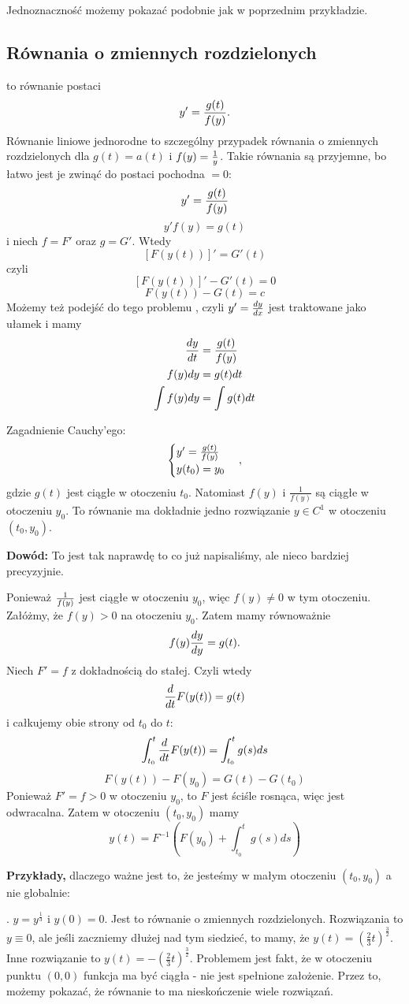 Jednoznaczność możemy pokazać podobnie jak w poprzednim przykładzie.

\subsection{Równania o zmiennych rozdzielonych}

 to równanie postaci
$$y'={g(t)\over f(y)}.$$
Równanie liniowe jednorodne to szczególny przypadek równania o zmiennych rozdzielonych dla $g(t)=a(t)$ i $f(y)={1\over y}$. Takie równania są przyjemne, bo łatwo jest je zwinąć do postaci pochodna $=0$:
$$y'={g(t)\over f(y)}$$
$$y'f(y)=g(t)$$
i niech $f=F'$ oraz $g=G'$. Wtedy
$$[F(y(t))]'=G'(t)$$
czyli
$$[F(y(t))]'-G'(t)=0$$
$$F(y(t))-G(t)=c$$
Możemy też podejść do tego problemu , czyli $y'={dy\over dx}$ jest traktowane jako ułamek i mamy
\begin{align*}
    {dy\over dt}&={g(t)\over f(y)}\\
    f(y)dy&=g(t)dt\\
    \int f(y)dy&=\int g(t)dt
\end{align*}

 Zagadnienie Cauchy'ego:
$$\begin{cases}y'={g(t)\over f(y)}\\y(t_0)=y_0\end{cases},$$
gdzie $g(t)$ jest ciągłe w otoczeniu $t_0$. Natomiast $f(y)$ i $\frac1{f(y)}$ są ciągłe w otoczeniu $y_0$. To równanie ma dokładnie jedno rozwiązanie $y\in C^1$ w otoczeniu $(t_0,y_0)$.

\textbf{Dowód:} To jest tak naprawdę to co już napisaliśmy, ale nieco bardziej precyzyjnie.

Ponieważ ${1\over f(y)}$ jest ciągłe w otoczeniu $y_0$, więc $f(y)\neq 0$ w tym otoczeniu. Załóżmy, że $f(y)>0$ na otoczeniu $y_0$. Zatem mamy równoważnie
$$f(y){dy\over dy}=g(t).$$
Niech $F'=f$ z dokładnością do stałej. Czyli wtedy
$${d\over dt}F(y(t))=g(t)$$
i całkujemy obie strony od ${t_0}$ do $t$:
$$\int_{t_0}^t{d\over dt}F(y(t))=\int_{t_0}^tg(s)ds$$
$$F(y(t))-F(y_0)=G(t)-G(t_0)$$
Ponieważ $F'=f>0$ w otoczeniu $y_0$, to $F$ jest ściśle rosnąca, więc jest odwracalna. Zatem w otoczeniu $(t_0, y_0)$ mamy
$$y(t)=F^{-1}(F(y_0)+\int_{t_0}^tg(s)ds)$$

\textbf{Przykłady,} dlaczego ważne jest to, że jesteśmy w małym otoczeniu $(t_0, y_0)$ a nie globalnie:

. $y=y^\frac13$ i $y(0)=0$. Jest to równanie o zmiennych rozdzielonych. Rozwiązania to $y\equiv 0$, ale jeśli zaczniemy dłużej nad tym siedzieć, to mamy, że $y(t)=\left(\frac23t\right)^\frac32$. Inne rozwiązanie to $y(t)=-\left(\frac23t\right)^\frac32$. Problemem jest fakt, że w otoczeniu punktu $(0, 0)$ funkcja ma być ciągła - nie jest spełnione założenie. Przez to, możemy pokazać, że równanie to ma nieskończenie wiele rozwiązań.


